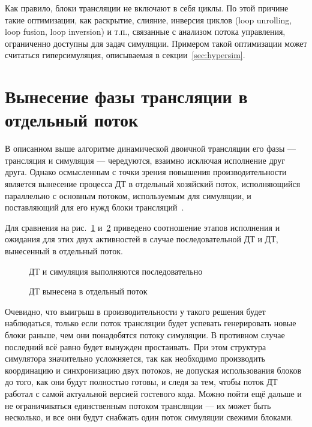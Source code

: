 Как правило, блоки трансляции не включают в себя циклы. По этой причине такие оптимизации, как раскрытие, слияние, инверсия циклов (\abbr loop unrolling, loop fusion, loop inversion) и т.п., связанные с анализом потока управления, ограниченно доступны для задач симуляции. Примером такой оптимизации может считаться гиперсимуляция, описываемая в секции~\ref{sec:hypersim}.

\section{Вынесение фазы трансляции в отдельный поток}\label{sec:parallel-bt}

В описанном выше алгоритме динамической двоичной трансляции его фазы --- трансляция и симуляция --- чередуются, взаимно исключая исполнение друг друга. Однако осмысленным с точки зрения повышения производительности является вынесение процесса ДТ в отдельный хозяйский поток, исполняющийся параллельно с основным потоком, используемым для симуляции, и поставляющий для его нужд блоки трансляций~\cite{pqemu2001}.

Для сравнения на рис.~\ref{fig:serial-bt} и~\ref{fig:parallel-bt} приведено соотношение этапов исполнения и ожидания для этих двух активностей в случае последовательной ДТ и ДТ, вынесенный в отдельный поток.

\begin{figure}[htb]
    \centering
    \caption{ДТ и симуляция выполняются последовательно}
    \label{fig:serial-bt}
\end{figure}

\begin{figure}[htb]
    \centering
    \caption{ДТ вынесена в отдельный поток}
    \label{fig:parallel-bt}
\end{figure}

Очевидно, что выигрыш в производительности у такого решения будет наблюдаться, только если поток трансляции будет успевать генерировать новые блоки раньше, чем они понадобятся потоку симуляции. В противном случае последний всё равно будет вынужден простаивать. При этом структура симулятора значительно усложняется, так как необходимо производить координацию и синхронизацию двух потоков, не допуская использования блоков до того, как они будут полностью готовы, и следя за тем, чтобы поток ДТ работал с самой актуальной версией гостевого кода. Можно пойти ещё дальше и не ограничиваться единственным потоком трансляции --- их может быть несколько, и все они будут снабжать один поток симуляции свежими блоками.

